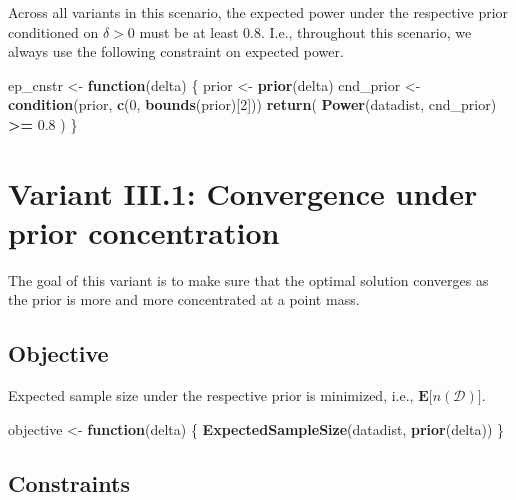 \documentclass[]{book}
\newenvironment{Shaded}{\begin{snugshade}}{\end{snugshade}}
\newcommand{\ControlFlowTok}[1]{\textcolor[rgb]{0.13,0.29,0.53}{\textbf{#1}}}
\newcommand{\DecValTok}[1]{\textcolor[rgb]{0.00,0.00,0.81}{#1}}
\newcommand{\FloatTok}[1]{\textcolor[rgb]{0.00,0.00,0.81}{#1}}
\newcommand{\KeywordTok}[1]{\textcolor[rgb]{0.13,0.29,0.53}{\textbf{#1}}}
\newcommand{\NormalTok}[1]{#1}
\newcommand{\OperatorTok}[1]{\textcolor[rgb]{0.81,0.36,0.00}{\textbf{#1}}}
\newcommand{\StringTok}[1]{\textcolor[rgb]{0.31,0.60,0.02}{#1}}
\begin{document}
Across all variants in this scenario, the expected power under the respective
prior conditioned on \(\delta > 0\) must be at least \(0.8\).
I.e., throughout this scenario, we always use the following constraint on
expected power.

\begin{Shaded}
\begin{Highlighting}[]
\NormalTok{ep_cnstr <-}\StringTok{ }\ControlFlowTok{function}\NormalTok{(delta) \{}
\NormalTok{    prior     <-}\StringTok{ }\KeywordTok{prior}\NormalTok{(delta)}
\NormalTok{    cnd_prior <-}\StringTok{ }\KeywordTok{condition}\NormalTok{(prior, }\KeywordTok{c}\NormalTok{(}\DecValTok{0}\NormalTok{, }\KeywordTok{bounds}\NormalTok{(prior)[}\DecValTok{2}\NormalTok{]))}
    \KeywordTok{return}\NormalTok{( }\KeywordTok{Power}\NormalTok{(datadist, cnd_prior) }\OperatorTok{>=}\StringTok{ }\FloatTok{0.8}\NormalTok{ )}
\NormalTok{\}}
\end{Highlighting}
\end{Shaded}

\hypertarget{variantIII_1}{%
\section{Variant III.1: Convergence under prior concentration}\label{variantIII_1}}

The goal of this variant is to make sure that the optimal solution
converges as the prior is more and more concentrated at a point mass.

\hypertarget{objective-6}{%
\subsection{Objective}\label{objective-6}}

Expected sample size under the respective prior is minimized, i.e.,
\(\boldsymbol{E}\big[n(\mathcal{D})\big]\).

\begin{Shaded}
\begin{Highlighting}[]
\NormalTok{objective <-}\StringTok{ }\ControlFlowTok{function}\NormalTok{(delta) \{}
    \KeywordTok{ExpectedSampleSize}\NormalTok{(datadist, }\KeywordTok{prior}\NormalTok{(delta))}
\NormalTok{\}}
\end{Highlighting}
\end{Shaded}

\hypertarget{constraints-6}{%
\subsection{Constraints}\label{constraints-6}}
\end{document}
